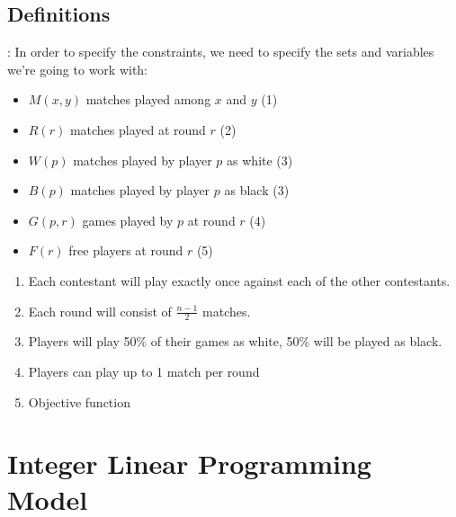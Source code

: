 \documentclass[
9pt,
aspectratio=169,
xcolor=table,
]{beamer}
\begin{document}
\subsection{Definitions}
\begin{frame}{\secname: \subsecname}
    In order to specify the constraints, we need to specify the sets and variables we're going to work with:
    \vspace{1cm}

    \begin{minipage}{0.49\textwidth}
	\begin{itemize}
	    \item $M(x, y)$ matches played among $x$ and $y$ (\textcolor{Veronablue}{1})
	    \item $R(r)$  matches played at round $r$ (\textcolor{Veronablue}{2})
	    \item $W(p)$ matches played by player $p$ as white (\textcolor{Veronablue}{3})
	    \item $B(p)$ matches played by player $p$ as black (\textcolor{Veronablue}{3})
	    \item $G(p,r)$ games played by $p$ at round $r$ (\textcolor{Veronablue}{4})
	    \item $F(r)$ free players at round $r$ (\textcolor{Veronablue}{5})
	\end{itemize}
    \end{minipage}
    \hfill
    \begin{minipage}{0.49\textwidth}
	\begin{enumerate}
	    \item Each contestant will play exactly once against each of the other contestants.
	    \item Each round will consist of $\frac{n-1}{2}$ matches.
	    \item Players will play 50\% of their games as white, 50\% will be played as black.
	    \item Players can play up to 1 match per round
	    \item Objective function
	\end{enumerate}
    \end{minipage}
    
\end{frame}

\section{Integer Linear Programming Model}
\end{document}
